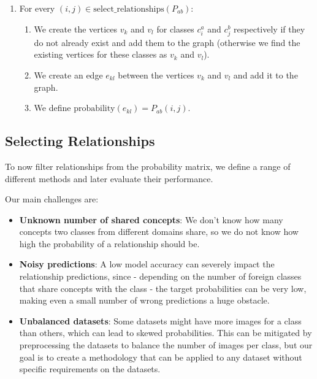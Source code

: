 \begin{enumerate}
\begin{enumerate}
                  \item For every $(i, j) \in \text{select\_relationships}(P_{ab})$:
                        \begin{enumerate}
                              \item We create the vertices $v_k$ and $v_l$ for classes $c_i^a$ and $c_j^b$ respectively
                                    if they do not already exist and add them to the graph
                                    (otherwise we find the existing vertices for these classes as $v_k$ and $v_l$).
                              \item We create an edge $e_{kl}$ between the vertices $v_k$ and $v_l$ and add it to the graph.
                              \item We define $\text{probability}(e_{kl}) = P_{ab}(i, j)$.
                        \end{enumerate}
            \end{enumerate}
\end{enumerate}

\subsection{Selecting Relationships}

To now filter relationships from the probability matrix,
we define a range of different methods and later evaluate their performance.

Our main challenges are:

\begin{itemize}
      \item \textbf{Unknown number of shared concepts}: We don't know how many concepts two classes from different
            domains share, so we do not know how high the probability of a relationship should be.
      \item \textbf{Noisy predictions}: A low model accuracy can severely impact the relationship
            predictions, since - depending on the number of foreign classes that share concepts with the class -
            the target probabilities can be very low, making even a small number of wrong predictions
            a huge obstacle.
      \item \textbf{Unbalanced datasets}: Some datasets might have more images for a class than others,
            which can lead to skewed probabilities.
            This can be mitigated by preprocessing the datasets to balance the number of images per class,
            but our goal is to create a methodology that can be applied to any dataset without
            specific requirements on the datasets.
\end{itemize}

